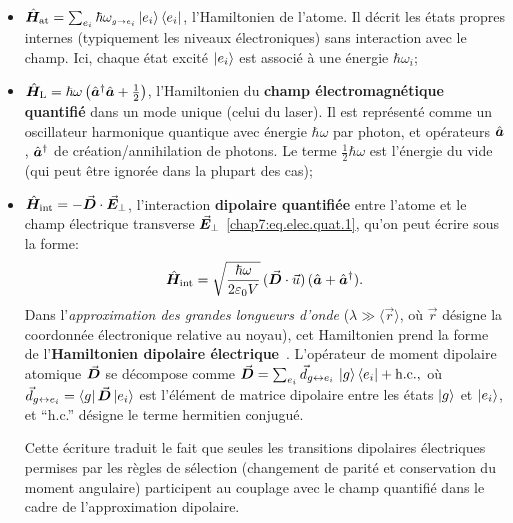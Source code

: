\smallskip

\begin{itemize}[label = $\bullet$]
	\item \(\hat{\bm{H}}_{\mathrm{at}} = \sum_{e_i} \hbar \omega_{\scriptscriptstyle g \rightarrow e_i } \ket{e_i}\bra{e_i} \), l’Hamiltonien de l’atome. Il décrit les états propres internes (typiquement les niveaux électroniques) sans interaction avec le champ. Ici, chaque état excité $\ket{e_i}$ est associé à une énergie $\hbar \omega_i$;
	\item \(\hat{\bm{H}}_{\mathrm{L}} = \hbar \omega \left(\hat{\bm{a}}^\dagger \hat{\bm{a}} + \frac{1}{2}\right)\), l’Hamiltonien du {\bf champ électromagnétique quantifié} dans un mode unique (celui du laser). Il est représenté comme un oscillateur harmonique quantique avec énergie $ \hbar \omega $  par photon, et opérateurs \( \hat{\bm{a}} \) , \( \hat{\bm{a}}^\dagger \) de création/annihilation de photons. Le terme $\tfrac12 \hbar \omega$ est l’énergie du vide (qui peut être ignorée dans la plupart des cas);
	\item $\hat{\bm{H}}_{\mathrm{int}} = - \vec{{\bm{D}}} \cdot \vec{{\bm{E}}}_\perp$, l’interaction \textbf{dipolaire quantifiée} entre l’atome et le champ électrique transverse $\vec{{\bm{E}}}_\perp$ \eqref{chap7:eq.elec.quat.1},  qu'on peut écrire sous la forme:
		\begin{eqnarray}
			\hat{\bm{H}}_{\mathrm{int}} 
			= \sqrt{\frac{\hbar \omega}{2\varepsilon_0 V}} \, (\vec{{\bm{D}}} \cdot \vec{u}) \, (\hat{\bm{a}} + \hat{\bm{a}}^\dagger).
		\end{eqnarray}
		Dans l’\textit{approximation des grandes longueurs d’onde} ($\lambda \gg \langle \vec{r} \rangle$, où $\vec{r}$ désigne la coordonnée électronique relative au noyau), cet Hamiltonien prend la forme de l’\textbf{Hamiltonien dipolaire électrique}~\cite{CohenTannoudji1988, grimm1999opticaldipoletrapsneutral}.  L’opérateur de moment dipolaire atomique $\vec{{\bm{D}}}$ se décompose comme
		\(
		\vec{{\bm{D}}} 
		= \sum_{e_i} \vec{d}_{g \leftrightarrow e_i} \, \ket{g} \bra{e_i} + \text{h.c.},
		\)
		où $\vec{d}_{g \leftrightarrow e_i} = \bra{g} \vec{{\bm{D}}} \ket{e_i}$ est l’élément de matrice dipolaire entre les états $\ket{g}$ et $\ket{e_i}$, et ``h.c.'' désigne le terme hermitien conjugué.  
		
		\medskip
		
		Cette écriture traduit le fait que seules les transitions dipolaires électriques permises par les règles de sélection (changement de parité et conservation du moment angulaire) participent au couplage avec le champ quantifié dans le cadre de l'approximation dipolaire.
	
\end{itemize}

